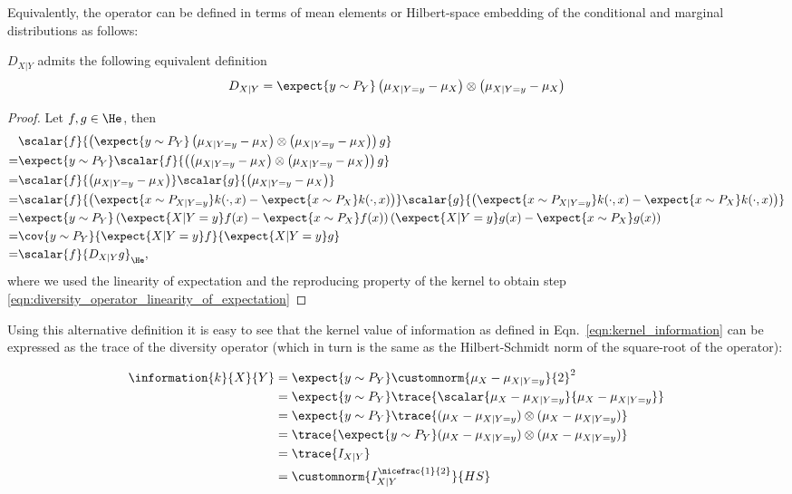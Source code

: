 Equivalently, the operator can be defined in terms of mean elements or Hilbert-space embedding of the conditional and marginal distributions as follows:

\begin{statement}
$D_{X\vert Y}$ admits the following equivalent definition
\begin{align}
	D_{X\vert Y} = \expect{y\sim P_Y} \left(\mu_{X\vert Y=y} - \mu_{X}\right) \otimes \left(\mu_{X\vert Y=y}  - \mu_{X} \right)
\end{align}

\begin{proof}
Let $f,g\in\He$, then
\begin{align}
	&\scalar{f}{ \left(\expect{y\sim P_Y}\left(\mu_{X\vert Y=y} - \mu_{X}\right) \otimes \left(\mu_{X\vert Y=y}  - \mu_{X} \right)\right) g}\\
	=&\expect{y\sim P_Y}\scalar{f}{ \left(\left(\mu_{X\vert Y=y} - \mu_{X}\right) \otimes \left(\mu_{X\vert Y=y}  - \mu_{X} \right)\right) g}\\
	=& \scalar{f}{\left(\mu_{X\vert Y=y} - \mu_{X}\right)}\scalar{g}{\left(\mu_{X\vert Y=y} - \mu_{X}\right)}\\
	=& \scalar{f}{\left(\expect{x\sim P_{X\vert Y=y}}k(\cdot,x) - \expect{x\sim P_X}k(\cdot,x)\right)}\scalar{g}{\left(\expect{x\sim P_{X\vert Y=y}}k(\cdot,x) - \expect{x\sim P_X}k(\cdot,x)\right)}\\
	=& \expect{y\sim P_Y} \left(\expect{X\vert Y=y} f(x) - \expect{x\sim P_X}f(x)\right)\left(\expect{X\vert Y=y} g(x) - \expect{x\sim P_X}g(x)\right)\label{eqn:diversity_operator_linearity_of_expectation}\\
	=& \cov{y\sim P_Y}{\expect{X\vert Y=y} f}{\expect{X\vert Y=y} g}\\
	=& \scalar{f}{D_{X\vert Y}g}_{\He},
\end{align}
where we used the linearity of expectation and the reproducing property of the kernel to obtain step \eqref{eqn:diversity_operator_linearity_of_expectation}
\end{proof}
\end{statement}

Using this alternative definition it is easy to see that the kernel value of information as defined in Eqn.\ \eqref{eqn:kernel_information} can be expressed as the trace of the diversity operator (which in turn is the same as the Hilbert-Schmidt norm of the square-root of the operator):

\begin{align}
	\information{k}{X}{Y} &= \expect{y \sim P_{Y}} \customnorm{\mu_X - \mu_{X\vert Y=y}}{2}^2\\
		&= \expect{y \sim P_{Y}} \trace{\scalar{\mu_X - \mu_{X\vert Y=y}}{\mu_X - \mu_{X\vert Y=y}}}\\
		&= \expect{y \sim P_{Y}} \trace{ ( \mu_X - \mu_{X\vert Y=y}) \otimes (\mu_X - \mu_{X\vert Y=y})}\\
		&= \trace{ \expect{y \sim P_{Y}} ( \mu_X - \mu_{X\vert Y=y}) \otimes (\mu_X - \mu_{X\vert Y=y})} \\
		&= \trace{I_{X\vert Y}}\\
		&= \customnorm{I_{X\vert Y}^{\nicefrac{1}{2}}}{HS}
\end{align}

